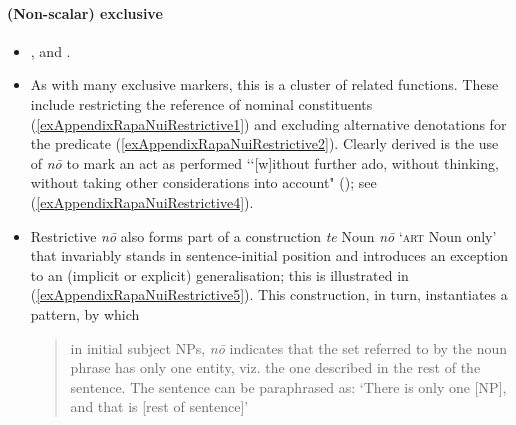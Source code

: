 \paragraph{(Non-scalar) exclusive}
\label{appendixRapanuiRestrictive}
\begin{itemize}
	\item \textcite[37, 78, 123–124]{duFeu1996}, \textcite[134, 272]{Fuentes1960} and \textcite[174, 266–268, 343–345]{Kieviet2017}.
	\item As with many exclusive markers, this is a cluster of related functions. These include restricting the reference of nominal constituents (\ref{exAppendixRapaNuiRestrictive1}) and excluding alternative denotations for  the predicate (\ref{exAppendixRapaNuiRestrictive2}). Clearly derived is the use of \textit{nō}  to mark an act as performed \lq\lq[w]ithout further ado, without thinking, without taking other considerations into account" (\cite[343]{Kieviet2017}); see (\ref{exAppendixRapaNuiRestrictive4}).
	\item Restrictive \textit{nō} also forms part of a construction \textit{te} Noun \textit{nō} \lq \textsc{art} Noun only' that invariably stands in sentence-initial position and introduces an exception to an (implicit or explicit) generalisation; this is illustrated in (\ref{exAppendixRapaNuiRestrictive5}). This construction, in turn, instantiates a pattern, by which
	
	\begin{quote} in initial subject NPs, \textit{nō} indicates that the set referred to by the noun phrase has only one entity, viz. the one described in the rest of the sentence. The sentence can be paraphrased as: ‘There is only one [NP], and that is [rest of sentence]\rq{ }\parencite[266]{Kieviet2017}
	\end{quote}
	
\end{itemize}
